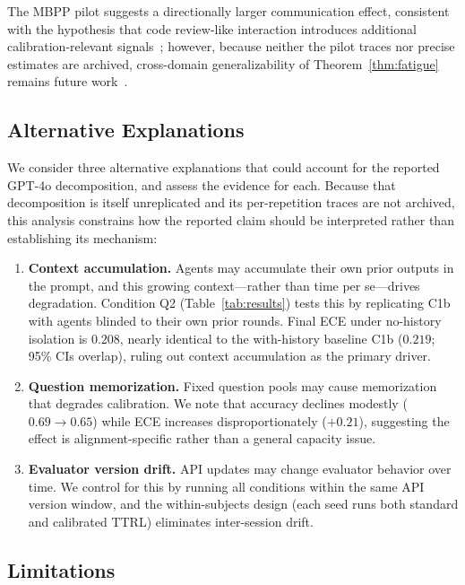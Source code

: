 \documentclass[11pt]{article}
\theoremstyle{definition}
\theoremstyle{remark}
\begin{document}
The MBPP pilot suggests a directionally larger communication effect, consistent with the hypothesis that code review-like interaction introduces additional calibration-relevant signals~\citep{sun2020test}; however, because neither the pilot traces nor precise estimates are archived, cross-domain generalizability of Theorem~\ref{thm:fatigue} remains future work~\citep{temporal2026}.

\subsection{Alternative Explanations}

We consider three alternative explanations that could account for the reported GPT-4o decomposition, and assess the evidence for each. Because that decomposition is itself unreplicated and its per-repetition traces are not archived, this analysis constrains how the reported claim should be interpreted rather than establishing its mechanism:

\begin{enumerate}[leftmargin=*,nosep]
    \item \textbf{Context accumulation.} Agents may accumulate their own prior outputs in the prompt, and this growing context---rather than time per se---drives degradation. Condition Q2 (Table~\ref{tab:results}) tests this by replicating C1b with agents blinded to their own prior rounds. Final ECE under no-history isolation is $0.208$, nearly identical to the with-history baseline C1b ($0.219$; 95\% CIs overlap), ruling out context accumulation as the primary driver.
    \item \textbf{Question memorization.} Fixed question pools may cause memorization that degrades calibration. We note that accuracy declines modestly ($0.69 \to 0.65$) while ECE increases disproportionately ($+0.21$), suggesting the effect is alignment-specific rather than a general capacity issue.
    \item \textbf{Evaluator version drift.} API updates may change evaluator behavior over time. We control for this by running all conditions within the same API version window, and the within-subjects design (each seed runs both standard and calibrated TTRL) eliminates inter-session drift.
\end{enumerate}

\subsection{Limitations}
\end{document}
